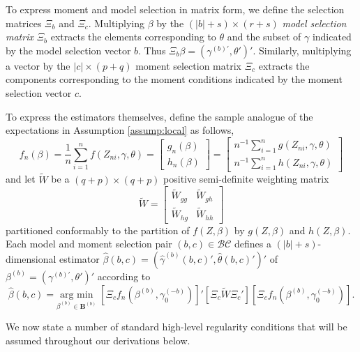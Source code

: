 To express moment and model selection in matrix form, we define the selection matrices $\Xi_b$ and $\Xi_c$.
Multiplying $\beta$ by the $(|b| + s)\times(r+s)$ \emph{model selection matrix} $\Xi_b$ extracts the elements corresponding to $\theta$ and the subset of $\gamma$ indicated by the model selection vector $b$. 
Thus $\Xi_b \beta = \left(\gamma^{(b)'}, \theta' \right)'$.
Similarly, multiplying a vector by the $|c|\times(p+q)$ moment selection matrix $\Xi_c$ extracts the components corresponding to the moment conditions indicated by the moment selection vector $c$. 

To express the estimators themselves, define the sample analogue of the expectations in Assumption \ref{assump:local} as follows,
\begin{equation}
	f_n(\beta) = \frac{1}{n}\sum_{i=1}^n f(Z_{ni}, \gamma, \theta) = \left[\begin{array}{c}g_n(\beta)\\ h_n(\beta) \end{array} \right] = \left[\begin{array}{c} n^{-1}\sum_{i=1}^n g(Z_{ni}, \gamma, \theta)\\n^{-1}\sum_{i=1}^n h(Z_{ni}, \gamma, \theta) \end{array}\right]
\end{equation}
and let $\widetilde{W}$ be a $(q+p)\times(q+p)$ positive semi-definite weighting matrix
\begin{equation}
	\widetilde{W} = \left[\begin{array}{cc} \widetilde{W}_{gg} & \widetilde{W}_{gh}\\ \widetilde{W}_{hg} & \widetilde{W}_{hh}  \end{array}\right]
\end{equation}
partitioned conformably to the partition of $f(Z,\beta)$ by $g(Z,\beta)$ and $h(Z,\beta)$. Each model and moment selection pair $(b,c)\in \mathcal{BC}$ defines a $(|b|+s)$-dimensional estimator $\widehat{\beta}(b,c)=( \widehat{\gamma}^{(b)}(b,c)',\widehat{\theta}(b,c)')'$ of $\beta^{(b)}= \left(\gamma^{(b)'}, \theta'  \right)'$ according to
	\begin{equation}
    \widehat{\beta}(b,c) = \underset{\beta^{(b)}\in \mathbf{B}^{(b)}} {\mbox{arg min}}\;\left[\Xi_c f_n\left(\beta^{(b)}, \gamma_0^{(-b)}\right)\right]'\left[\Xi_c \widetilde{W}\Xi_c' \right]\left[\Xi_c f_n\left(\beta^{(b)}, \gamma_0^{(-b)}\right)\right].
	\end{equation}

We now state a number of standard high-level regularity conditions that will be assumed throughout our derivations below.

